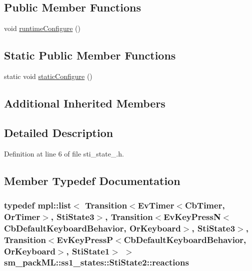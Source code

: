 \subsection*{Public Member Functions}
\begin{DoxyCompactItemize}
\item 
void \hyperlink{structsm__packML_1_1ss1__states_1_1StiState2_a329c6279291cb6deddfbc0b3ba4ee30a}{runtime\+Configure} ()
\end{DoxyCompactItemize}
\subsection*{Static Public Member Functions}
\begin{DoxyCompactItemize}
\item 
static void \hyperlink{structsm__packML_1_1ss1__states_1_1StiState2_ae00363afcf0075fcfc3513b93ea69ce7}{static\+Configure} ()
\end{DoxyCompactItemize}
\subsection*{Additional Inherited Members}


\subsection{Detailed Description}


Definition at line 6 of file sti\+\_\+state\+\_.\+h.



\subsection{Member Typedef Documentation}
\subsubsection[{\texorpdfstring{reactions}{reactions}}]{\setlength{\rightskip}{0pt plus 5cm}typedef mpl\+::list$<$ Transition$<$Ev\+Timer$<$Cb\+Timer, {\bf Or\+Timer}$>$, {\bf Sti\+State3}$>$, Transition$<$Ev\+Key\+PressN$<$Cb\+Default\+Keyboard\+Behavior, {\bf Or\+Keyboard}$>$, {\bf Sti\+State3}$>$, Transition$<$Ev\+Key\+PressP$<$Cb\+Default\+Keyboard\+Behavior, {\bf Or\+Keyboard}$>$, {\bf Sti\+State1}$>$ $>$ {\bf sm\+\_\+pack\+M\+L\+::ss1\+\_\+states\+::\+Sti\+State2\+::reactions}}\hypertarget{structsm__packML_1_1ss1__states_1_1StiState2_a8546078af2aba8703624ce61b75ea146}{}\label{structsm__packML_1_1ss1__states_1_1StiState2_a8546078af2aba8703624ce61b75ea146}


